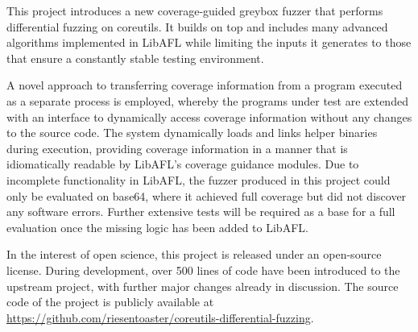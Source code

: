 \documentclass{article}
\begin{document}
\begin{multicols}{2}
    This project introduces a new coverage-guided greybox fuzzer that performs differential fuzzing on coreutils. It builds on top and includes many advanced algorithms implemented in LibAFL while limiting the inputs it generates to those that ensure a constantly stable testing environment.

    A novel approach to transferring coverage information from a program executed as a separate process is employed, whereby the programs under test are extended with an interface to dynamically access coverage information without any changes to the source code. The system dynamically loads and links helper binaries during execution, providing coverage information in a manner that is idiomatically readable by LibAFL's coverage guidance modules.
    Due to incomplete functionality in LibAFL, the fuzzer produced in this project could only be evaluated on base64, where it achieved full coverage but did not discover any software errors. Further extensive tests will be required as a base for a full evaluation once the missing logic has been added to LibAFL.



\end{multicols}
\vspace{70px}
\begin{center}

    \begin{minipage}{0.7\textwidth}
        \centering
        In the interest of open science, this project is released under an open-source license. During development, over 500 lines of code have been introduced to the upstream project, with further major changes already in discussion. The source code of the project is publicly available at\\\vspace{8px}\href{https://github.com/riesentoaster/coreutils-differential-fuzzing}{https://github.com/riesentoaster/coreutils-differential-fuzzing}.
    \end{minipage}

\end{center}

\pagebreak

\end{document}
